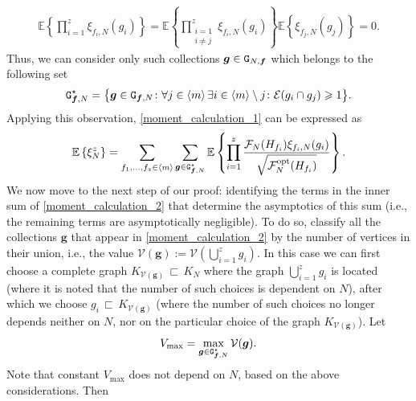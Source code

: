 \documentclass[11pt,reqno]{amsart}
\numberwithin{equation}{section}
\newcommand{\sprod}[1]{\langle#1\rangle}
\newcommand{\E}[1]{\mathbb{E}\left\{ #1\right\}}
\newcommand{\kb}[1]{\boldsymbol{#1}}
\newcommand{\vk}[1]{\kb{#1}}
\begin{document}
\begin{align}
    \E{\prod_{i=1}^{z}\xi_{f_i,{N}}(g_i)} = \E{\prod_{\substack{i=1 \\ i\not= j}}^{z}\xi_{f_i,{N}}(g_i)}\E{\xi_{f_{j},{N}}(g_{j})} = 0.\label{exp_decomposition}
\end{align}
Thus, we can consider only such collections $\vk g\in{\tt G}_{N,\vk f}$ which belongs to the following set
\begin{align}
    {\tt G}^{\star}_{\vk f, N} = \bigl\{\vk g\in{\tt G}_{\vk f,N}\colon\forall j\in\sprod{m} \,\exists i\in\sprod{m}\setminus j\colon \mathcal{E}(g_i\cap g_j)\geqslant 1\bigr\}.\label{g_condition}
\end{align}
Applying this observation,  \eqref{moment_calculation_1} can be expressed as
\begin{align}
     \E{\xi_{{N}}^z} = \sum_{f_1,\ldots,f_{z}\in\sprod{m}}\sum_{\vk g\in{\tt G}^{\star}_{\vk f,N}}\E{\prod_{i=1}^{z}\frac{\mathcal{F}_{{N}}({H}_{f_i})\xi_{f_i,{N}}(g_i)}{\sqrt{\mathcal{F}^{\rm opt}_N({H}_{f_i})}}}.\label{moment_calculation_2}
\end{align}
{We now move to the next step of our proof: identifying the terms in the inner sum of \eqref{moment_calculation_2} that determine the asymptotics of this sum (i.e., the remaining terms are asymptotically negligible).}
To do so,  classify all the collections $\vk g$ that appear in \eqref{moment_calculation_2} by the number of vertices in their union, i.e., the value $\mathcal{V}(\vk g) := \mathcal{V}\left(\bigcup_{i=1}^{z}g_i\right)$. In this case we can first choose a complete graph $K_{\mathcal{V}(\vk g)}{\,\sqsubset\,} K_N$ where the graph $\bigcup_{i=1}^{z}g_i$ is located (where it is noted that the number of such choices is dependent on $N$), after which we choose $g_i{\,\sqsubset\,} K_{\mathcal{V}(\vk g)}$ (where the number of such choices no longer depends neither on $N$, nor on the particular choice of the graph $K_{\mathcal{V}(\vk g)}$). Let
\begin{align*}
    V_{\max} = \max\limits_{\vk g\in{\tt G}^{\star}_{\vk f,N}}\mathcal{V}(\vk g).
\end{align*}
Note that constant $V_{\max}$ does not depend on $N$, based on the above considerations. Then
\end{document}
